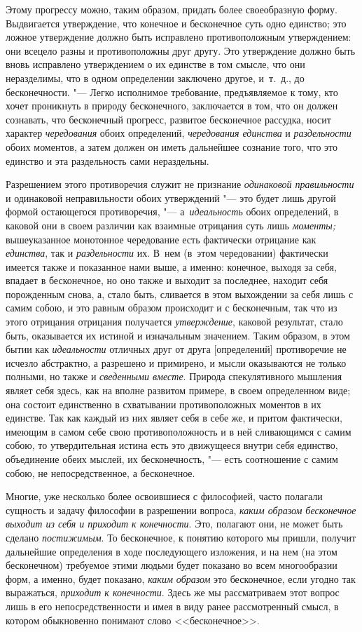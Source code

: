 Этому прогрессу можно, таким образом, придать более своеобразную форму.
Выдвигается утверждение, что конечное и бесконечное суть одно единство; это
ложное утверждение должно быть исправлено противоположным утверждением: они
всецело разны и противоположны друг другу. Это утверждение должно быть
вновь исправлено утверждением о их единстве в том смысле, что они
неразделимы, что в одном определении заключено другое, и~т.~д., до
бесконечности. "--- Легко исполнимое требование, предъявляемое к тому, кто
хочет проникнуть в природу бесконечного, заключается в том, что он должен
сознавать, что бесконечный прогресс, развитое бесконечное рассудка, носит
характер {\em чередования} обоих определений,
{\em чередования единства} и
{\em раздельности} обоих моментов, а затем должен он
иметь дальнейшее сознание того, что это единство и эта раздельность сами
нераздельны.

Разрешением этого противоречия служит не признание
{\em одинаковой правильности} и одинаковой
неправильности обоих утверждений "--- это будет лишь другой формой остающегося
противоречия, "--- а~{\em идеальность} обоих определений,
в каковой они в своем различии как взаимные отрицания суть лишь
{\em моменты;} вышеуказанное монотонное чередование
есть фактически отрицание как {\em единства}, так и
{\em раздельности} их. В~нем (в~этом чередовании)
фактически имеется также и показанное нами выше, а именно: конечное, выходя
за себя, впадает в бесконечное, но оно также и выходит за последнее,
находит себя порожденным снова, а, стало быть, сливается в этом выхождении
за себя лишь с самим собою, и это равным образом происходит и с
бесконечным, так что из этого отрицания отрицания получается
{\em утверждение}, каковой результат, стало быть,
оказывается их истиной и изначальным значением. Таким образом, в этом бытии
как {\em идеальности} отличных друг от друга
[определений] противоречие не исчезло абстрактно, а разрешено и примирено,
и мысли оказываются не только полными, но также и
{\em сведенными вместе}. Природа спекулятивного
мышления являет себя здесь, как на вполне развитом примере, в своем
определенном виде; она состоит единственно в схватывании противоположных
моментов в их единстве. Так как каждый из них являет себя в себе же, и
притом фактически, имеющим в самом себе свою противоположность и в ней
сливающимся с самим собою, то утвердительная истина есть это движущееся
внутри себя единство, объединение обеих мыслей, их бесконечность, "--- есть
соотношение с самим собою, не непосредственное, а бесконечное.

Многие, уже несколько более освоившиеся с философией, часто полагали
сущность и задачу философии в разрешении вопроса,
{\em каким образом бесконечное выходит из себя и
приходит к конечности}. Это, полагают они, не может быть сделано
{\em постижимым}. То бесконечное, к понятию которого мы
пришли, получит дальнейшие определения в ходе последующего изложения, и на
нем (на этом бесконечном) требуемое этими людьми будет показано во всем
многообразии форм, а именно, будет показано, {\em каким
образом} это бесконечное, если угодно так выражаться,
{\em приходит к конечности}. Здесь же мы рассматриваем
этот вопрос лишь в его непосредственности и имея в виду ранее рассмотренный
смысл, в котором обыкновенно понимают слово <<бесконечное>>.


